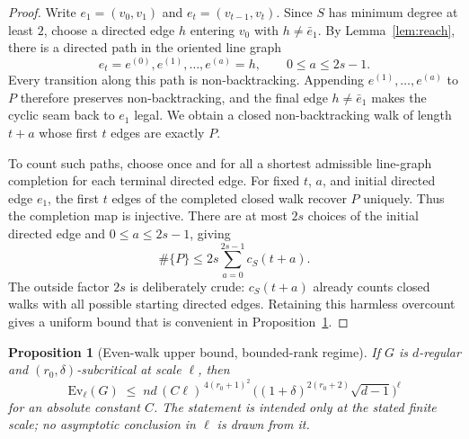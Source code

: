 \documentclass[11pt]{article}
\newtheorem{proposition}[lemma]{Proposition}
\theoremstyle{remark}
\begin{document}
\begin{proof}
Write $e_1=(v_0,v_1)$ and $e_t=(v_{t-1},v_t)$. Since $S$ has minimum degree at least
$2$, choose a directed edge $h$ entering $v_0$ with $h\ne\bar e_1$. By
Lemma~\ref{lem:reach}, there is a directed path in the oriented line graph
\[
e_t=e^{(0)},e^{(1)},\ldots,e^{(a)}=h,
\qquad 0\le a\le2s-1.
\]
Every transition along this path is non-backtracking. Appending
$e^{(1)},\ldots,e^{(a)}$ to $P$ therefore preserves non-backtracking, and the final edge
$h\ne\bar e_1$ makes the cyclic seam back to $e_1$ legal. We obtain a closed
non-backtracking walk of length $t+a$ whose first $t$ edges are exactly $P$.

To count such paths, choose once and for all a shortest admissible line-graph completion for
each terminal directed edge. For fixed $t$, $a$, and initial directed edge $e_1$, the first
$t$ edges of the completed closed walk recover $P$ uniquely. Thus the completion map is
injective. There are at most $2s$ choices of the initial directed edge and
$0\le a\le2s-1$, giving
\[
\#\{P\}\le2s\sum_{a=0}^{2s-1}c_S(t+a).
\]
The outside factor $2s$ is deliberately crude: $c_S(t+a)$ already counts closed walks with
all possible starting directed edges. Retaining this harmless overcount gives a uniform bound
that is convenient in Proposition~\ref{prop:upper}.
\end{proof}

\begin{proposition}[Even-walk upper bound, bounded-rank regime]\label{prop:upper}
If $G$ is $d$-regular and $(r_0,\delta)$-subcritical at scale $\ell$,
then
\[
\mathrm{Ev}_\ell(G)\;\le\;
nd\,(C\ell)^{\,4(r_0+1)^2}\,
\Big((1+\delta)^{2(r_0+2)}\sqrt{d-1}\Big)^{\ell}
\]
for an absolute constant $C$. The statement is intended only at the stated
finite scale; no asymptotic conclusion in $\ell$ is drawn from it.
\end{proposition}
\end{document}
